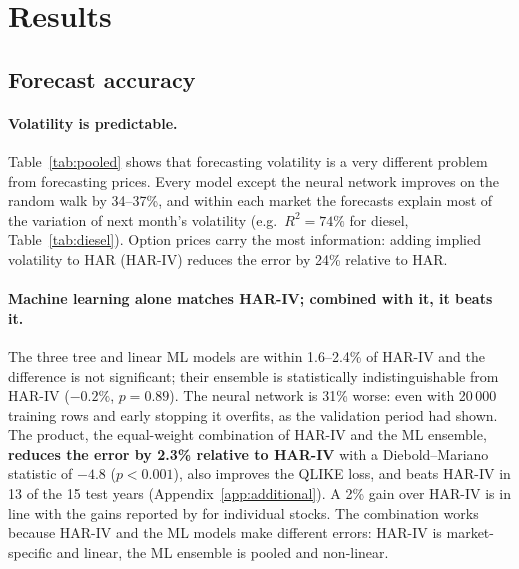\section{Results}\label{sec:results}

\subsection{Forecast accuracy}

\begin{table}[H]
\centering\small
{}
\caption{Out-of-sample accuracy, 22 markets, 2012--2026 (80\,224 market-days). Loss: squared error of log
volatility; $R^2$ vs a benchmark is the reduction of its MSE. DM: Diebold--Mariano statistic against
HAR-IV on the daily cross-market average loss (Newey--West, 21 lags); negative values favour the model.}
\label{tab:pooled}
\end{table}

\paragraph{Volatility is predictable.} Table~\ref{tab:pooled} shows that forecasting volatility is a very
different problem from forecasting prices. Every model except the neural network improves on the random
walk by 34--37\%, and within each market the forecasts explain most of the variation of next month's
volatility (e.g.\ $R^2=74\%$ for diesel, Table~\ref{tab:diesel}). Option prices carry the most information:
adding implied volatility to HAR (HAR-IV) reduces the error by 24\% relative to HAR.

\paragraph{Machine learning alone matches HAR-IV; combined with it, it beats it.} The three tree and
linear ML models are within 1.6--2.4\% of HAR-IV and the difference is not significant; their ensemble is
statistically indistinguishable from HAR-IV ($-0.2\%$, $p=0.89$). The neural network is 31\% worse: even
with 20\,000 training rows and early stopping it overfits, as the validation period had shown. The product,
the equal-weight combination of HAR-IV and the ML ensemble, \textbf{reduces the error by 2.3\% relative to
HAR-IV} with a Diebold--Mariano statistic of $-4.8$ ($p<0.001$), also improves the QLIKE loss, and beats
HAR-IV in 13 of the 15 test years (Appendix~\ref{app:additional}). A 2\% gain over HAR-IV is in line with
the gains reported by \citet{christensen2023} for individual stocks. The combination works because HAR-IV and
the ML models make different errors: HAR-IV is market-specific and linear, the ML ensemble is pooled and
non-linear.

